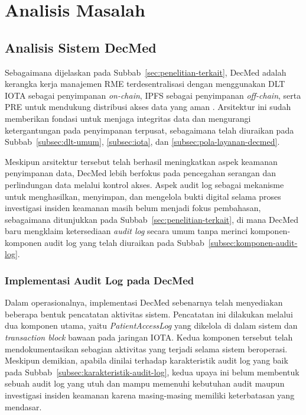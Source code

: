 
\section{Analisis Masalah}

\subsection{Analisis Sistem DecMed}
\label{analisis-decmed}

Sebagaimana dijelaskan pada Subbab~\ref{sec:penelitian-terkait}, DecMed adalah kerangka kerja manajemen RME terdesentralisasi dengan menggunakan DLT IOTA sebagai penyimpanan \textit{on-chain}, IPFS sebagai penyimpanan \textit{off-chain}, serta PRE untuk mendukung distribusi akses data yang aman \cite{DecMed}. Arsitektur ini sudah memberikan fondasi untuk menjaga integritas data dan mengurangi ketergantungan pada penyimpanan terpusat, sebagaimana telah diuraikan pada Subbab~\ref{subsec:dlt-umum}, \ref{subsec:iota}, dan \ref{subsec:pola-layanan-decmed}.

Meskipun arsitektur tersebut telah berhasil meningkatkan aspek keamanan penyimpanan data, DecMed lebih berfokus pada pencegahan serangan dan perlindungan data melalui kontrol akses. Aspek audit log sebagai mekanisme untuk menghasilkan, menyimpan, dan mengelola bukti digital selama proses investigasi insiden keamanan masih belum menjadi fokus pembahasan, sebagaimana ditunjukkan pada Subbab~\ref{sec:penelitian-terkait}, di mana DecMed baru mengklaim ketersediaan \textit{audit log} secara umum tanpa merinci komponen-komponen audit log yang telah diuraikan pada Subbab~\ref{subsec:komponen-audit-log}.

\subsubsection{Implementasi Audit Log pada DecMed}
\label{subsubsec:implementasi-audit-log}

Dalam operasionalnya, implementasi DecMed sebenarnya telah menyediakan beberapa bentuk pencatatan aktivitas sistem. Pencatatan ini dilakukan melalui dua komponen utama, yaitu \textit{PatientAccessLog} yang dikelola di dalam sistem dan \textit{transaction block} bawaan pada jaringan IOTA. Kedua komponen tersebut telah mendokumentasikan sebagian aktivitas yang terjadi selama sistem beroperasi. Meskipun demikian, apabila dinilai terhadap karakteristik audit log yang baik pada Subbab~\ref{subsec:karakteristik-audit-log}, kedua upaya ini belum membentuk sebuah audit log yang utuh dan mampu memenuhi kebutuhan audit maupun investigasi insiden keamanan karena masing-masing memiliki keterbatasan yang mendasar.

